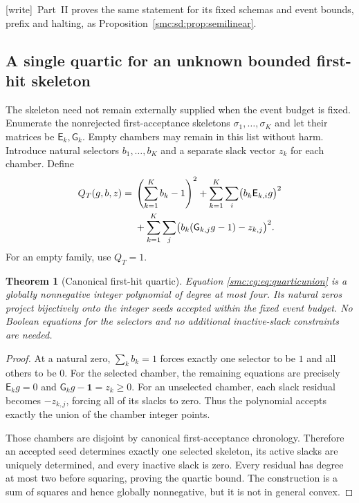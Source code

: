 \documentclass[11pt,letterpaper]{article}
\numberwithin{equation}{section}
\newtheorem{theorem}{Theorem}[section]
\theoremstyle{definition}
\theoremstyle{remark}
\newcommand{\wtag}{\textup{[write]}}
\begin{document}
\wtag\ Part~II proves the same statement for its fixed schemas and event bounds, prefix and halting, as Proposition~\ref{smc:sd:prop:semilinear}.

\subsection{A single quartic for an unknown bounded first-hit skeleton}

The skeleton need not remain externally supplied when the event budget is
fixed. Enumerate the nonrejected first-acceptance skeletons
$\sigma_1,\ldots,\sigma_K$ and let their matrices be
$\mathsf E_k,\mathsf G_k$. Empty chambers may remain in this list without
harm. Introduce natural selectors $b_1,\ldots,b_K$ and a separate slack
vector $z_k$ for each chamber. Define
\begin{align}
 Q_T(g,b,z)
  ={}&\left(\sum_{k=1}^K b_k-1\right)^2
  +\sum_{k=1}^K\sum_i\bigl(b_k\mathsf E_{k,i}g\bigr)^2\notag\\
  &+\sum_{k=1}^K\sum_j
       \bigl(b_k(\mathsf G_{k,j}g-1)-z_{k,j}\bigr)^2.
 \label{smc:cg:eq:quarticunion}
\end{align}
For an empty family, use $Q_T=1$.

\begin{theorem}[Canonical first-hit quartic]
\label{smc:cg:thm:quarticunion}
Equation \eqref{smc:cg:eq:quarticunion} is a globally nonnegative integer polynomial
of degree at most four. Its natural zeros project bijectively onto the
integer seeds accepted within the fixed event budget. No Boolean equations
for the selectors and no additional inactive-slack constraints are needed.
\end{theorem}
\begin{proof}
At a natural zero, $\sum_kb_k=1$ forces exactly one selector to be $1$ and
all others to be $0$. For the selected chamber, the remaining equations are
precisely $\mathsf E_kg=0$ and
$\mathsf G_kg-\mathbf1=z_k\ge0$. For an unselected chamber, each slack
residual becomes $-z_{k,j}$, forcing all of its slacks to zero. Thus the
polynomial accepts exactly the union of the chamber integer points.

Those chambers are disjoint by canonical first-acceptance chronology.
Therefore an accepted seed determines exactly one selected skeleton, its
active slacks are uniquely determined, and every inactive slack is zero.
Every residual has degree at most two before squaring, proving the quartic
bound. The construction is a sum of squares and hence globally nonnegative,
but it is not in general convex.
\end{proof}
\end{document}
